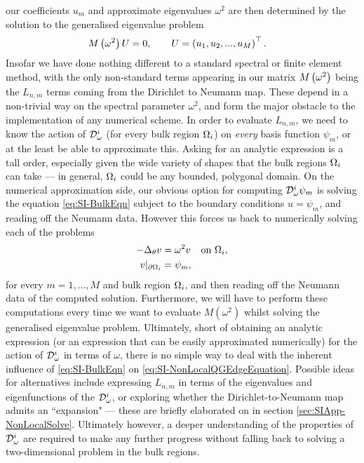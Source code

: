 our coefficients $u_m$ and approximate eigenvalues $\omega^2$ are then determined by the solution to the generalised eigenvalue problem
\begin{align*}
	M\left( \omega^2 \right)U &= 0,
	\qquad
	U = \left( u_1, u_2, ... , u_M \right)^{\top}.
\end{align*}
Insofar we have done nothing different to a standard spectral or finite element method, with the only non-standard terms appearing in our matrix $M\left( \omega^2 \right)$ being the $L_{n,m}$ terms coming from the Dirichlet to Neumann map.
These depend in a non-trivial way on the spectral parameter $\omega^2$, and form the major obstacle to the implementation of any numerical scheme.
In order to evaluate $L_{n,m}$, we need to know the action of $\mathcal{D}_{\omega}^i$ (for every bulk region $\Omega_i$) on \emph{every} basis function $\psi_m$, or at the least be able to approximate this.
Asking for an analytic expression is a tall order, especially given the wide variety of shapes that the bulk regions $\Omega_i$ can take --- in general, $\Omega_i$ could be any bounded, polygonal domain.
On the numerical approximation side, our obvious option for computing $\mathcal{D}^i_\omega\psi_m$ is solving the equation \eqref{eq:SI-BulkEqn} subject to the boundary conditions $u=\psi_m$, and reading off the Neumann data.
However this forces us back to numerically solving each of the problems
\begin{align*}
	-\Delta_{\theta}v &= \omega^2 v &\text{on } \Omega_i, \\
	v\vert_{\partial\Omega_i} &= \psi_m,
\end{align*}
for every $m=1,...,M$ and bulk region $\Omega_i$, and then reading off the Neumann data of the computed solution.
Furthermore, we will have to perform these computations every time we want to evaluate $M(\omega^2)$ whilst solving the generalised eigenvalue problem.
Ultimately, short of obtaining an analytic expression (or an expression that can be easily approximated numerically) for the action of $\mathcal{D}^i_{\omega}$ in terms of $\omega$, there is no simple way to deal with
the inherent influence of \eqref{eq:SI-BulkEqn} on \eqref{eq:SI-NonLocalQGEdgeEquation}.
Possible ideas for alternatives include expressing $L_{n,m}$ in terms of the eigenvalues and eigenfunctions of the $\mathcal{D}^i_\omega$, or exploring whether the Dirichlet-to-Neumann map admits an ``expansion" --- these are briefly elaborated on in section \ref{sec:SIApp-NonLocalSolve}.
Ultimately however, a deeper understanding of the properties of $\mathcal{D}_\omega^i$ are required to make any further progress without falling back to solving a two-dimensional problem in the bulk regions.
